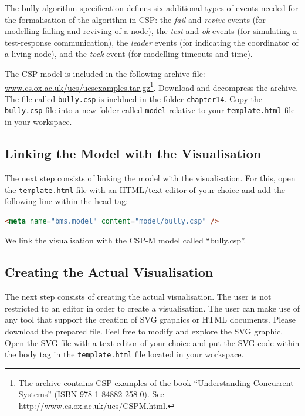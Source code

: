 The bully algorithm specification defines six additional types of events needed for the formalisation of the algorithm in CSP:
the \textit{fail} and \textit{revive} events (for modelling failing and reviving of a node), the \textit{test} and \textit{ok} events (for simulating a test-response communication), the \textit{leader} events (for indicating the coordinator of a living node), and the \textit{tock} event (for modelling timeouts and time).

The CSP model is included in the following archive file: \url{www.cs.ox.ac.uk/ucs/ucsexamples.tar.gz}\footnote{The archive contains CSP examples of the book ``Understanding Concurrent Systems'' (ISBN 978-1-84882-258-0). See \url{http://www.cs.ox.ac.uk/ucs/CSPM.html}.}.
Download and decompress the archive.
The file called \texttt{bully.csp} is incldued in the folder \texttt{chapter14}.
Copy the \texttt{bully.csp} file into a new folder called \texttt{model} relative to your \texttt{template.html} file in your workspace.

\subsection{Linking the Model with the Visualisation}

The next step consists of linking the model with the visualisation.
For this, open the \texttt{template.html} file with an HTML/text editor of your choice and add the following line within the head tag:

\begin{lstlisting}[language=html]
<meta name="bms.model" content="model/bully.csp" />
\end{lstlisting}

We link the visualisation with the CSP-M model called ``bully.csp''.

\subsection{Creating the Actual Visualisation}
\label{tutorial_csp_create_vis}

The next step consists of creating the actual visualisation.
The user is not restricted to an editor in order to create a visualisation.
The user can make use of any tool that support the creation of SVG graphics or HTML documents.
Please download the prepared  file.
Feel free to modify and explore the SVG graphic.
Open the SVG file with a text editor of your choice and put the SVG code within the body tag in the \texttt{template.html} file located in your workspace.

